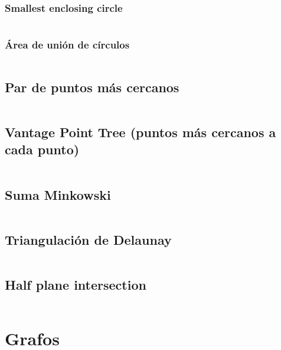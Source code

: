 \documentclass[11pt]{article}
\begin{document}
			\subsubsection{Smallest enclosing circle}
			\inputminted[tabsize=2,breaklines,firstline=456,lastline=487,fontsize=\small]{c++}{geometry.cpp}
			
			\subsubsection{Área de unión de círculos}
			\inputminted[tabsize=2,breaklines,firstline=773,lastline=845,fontsize=\small]{c++}{geometry.cpp}
		
		\subsection{Par de puntos más cercanos}
		\inputminted[tabsize=2,breaklines,firstline=489,lastline=515,fontsize=\small]{c++}{geometry.cpp}
		
		\subsection{Vantage Point Tree (puntos más cercanos a cada punto)}
		\inputminted[tabsize=2,breaklines,firstline=517,lastline=580,fontsize=\small]{c++}{geometry.cpp}
		
		\subsection{Suma Minkowski}
		\inputminted[tabsize=2,breaklines,firstline=582,lastline=603,fontsize=\small]{c++}{geometry.cpp}
		
		\subsection{Triangulación de Delaunay}
		\inputminted[tabsize=2,breaklines,firstline=605,lastline=771,fontsize=\small]{c++}{geometry.cpp}
		
		\subsection{Half plane intersection}
		\inputminted[tabsize=2,breaklines,firstline=847,lastline=920,fontsize=\small]{c++}{geometry.cpp}
		
	\newpage
	\section{Grafos}
\end{document}
